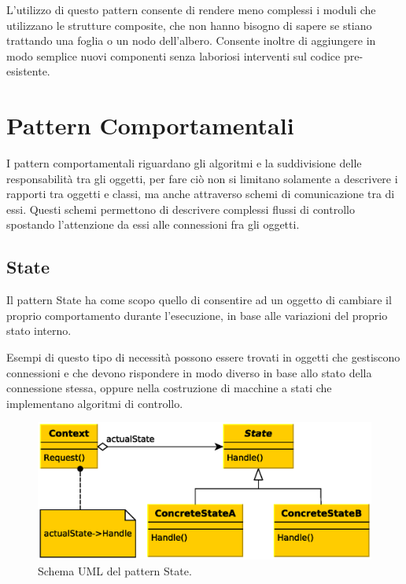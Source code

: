 L'utilizzo di questo pattern consente di rendere meno complessi i moduli che utilizzano le strutture composite, che non hanno bisogno di sapere se stiano trattando una foglia o un nodo dell'albero. Consente inoltre di aggiungere in modo semplice nuovi componenti senza laboriosi interventi sul codice pre-esistente.


\section{Pattern Comportamentali}
I pattern comportamentali riguardano gli algoritmi e la suddivisione delle responsabilità tra gli oggetti, per fare ciò non si limitano solamente a descrivere i rapporti tra oggetti e classi, ma anche attraverso schemi di comunicazione tra di essi. Questi schemi permettono di descrivere complessi flussi di controllo spostando l'attenzione da essi alle connessioni fra gli oggetti.

\subsection{State}
\label{sub:state}
Il pattern State ha come scopo quello di consentire ad un oggetto di cambiare il proprio comportamento durante l'esecuzione, in base alle variazioni del proprio stato interno.

Esempi di questo tipo di necessità possono essere trovati in oggetti che gestiscono connessioni e che devono rispondere in modo diverso in base allo stato della connessione stessa, oppure nella costruzione di macchine a stati che implementano algoritmi di controllo.

\begin{figure}
\begin{center}
\includegraphics[width=12cm]{Immagini/StatePattern}
\caption{Schema UML del pattern State.\label{f:statepattern}} 
\end{center} 
\end{figure}

